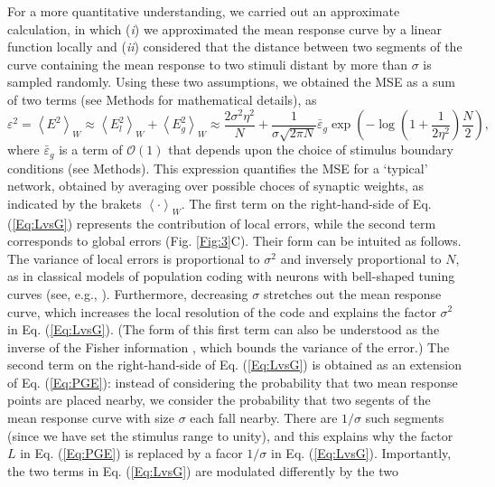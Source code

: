 \documentclass[a4paper]{article}%
\begin{document}
For a more quantitative understanding, we carried out an approximate
calculation, in which (\textit{i}) we approximated the mean response curve by
a linear function locally and (\textit{ii}) considered that the distance
between two segments of the curve containing the mean response to two stimuli
distant by more than $\sigma$ is sampled randomly. Using these two
assumptions, we obtained the MSE as a sum of two terms (see Methods for
mathematical details), as
\begin{equation}
\varepsilon^2 = \left\langle E^{2}\right\rangle _{W}\approx\left\langle
E_{l}^{2}\right\rangle _{W}+\left\langle E_{g}
^{2}\right\rangle _{W}\approx\frac{2\sigma^{2}\eta^{2}}{N}+\frac{1}
{\sigma\sqrt{2\pi N}}\bar{\varepsilon}_{g}\exp\left(  {-\log}\left(
{1+\frac{1}{2\eta^{2}}}\right)  \frac{N}{2}\right)  ,\label{Eq:LvsG}
\end{equation}
where $\bar{\varepsilon}_{g}$ is a term of $\mathcal{O}\left(  1\right)  $
that depends upon the choice of stimulus boundary conditions (see Methods).
This expression quantifies the MSE for a `typical' network, obtained by
averaging over possible choces of synaptic weights, as indicated by the
brakets $\left\langle \cdot\right\rangle _{W}$. The first term on the
right-hand-side of Eq. (\ref{Eq:LvsG}) represents the contribution of local
errors, while the second term corresponds to global errors (Fig.
\ref{Fig:3}C). Their form can be intuited as follows. The variance of local
errors is proportional to $\sigma^{2}$ and inversely proportional to $N$, as
in classical models of population coding with neurons with bell-shaped tuning
curves (see, e.g., \cite{Dayan2001TheoreticalSystems}). Furthermore, decreasing $\sigma$ stretches out the mean
response curve, which increases the local resolution of the code and explains
the factor $\sigma^{2}$ in Eq. (\ref{Eq:LvsG}). (The form of this first term
can also be understood as the inverse of the Fisher information
\cite[]{Seung1993SimpleCodes,Brunel1998MutualCoding}, which bounds the
variance of the error.) The second term on the right-hand-side of Eq.
(\ref{Eq:LvsG}) is obtained as an extension of Eq. (\ref{Eq:PGE}): instead of
considering the probability that two mean response points are placed nearby,
we consider the probability that two segents of the mean response curve with
size $\sigma$ each fall nearby. There are $1/\sigma$ such segments (since we
have set the stimulus range to unity), and this explains why the factor $L$ in
Eq. (\ref{Eq:PGE}) is replaced by a facor $1/\sigma$ in Eq. (\ref{Eq:LvsG}). Importantly, the
two terms in Eq. (\ref{Eq:LvsG}) are modulated differently by the two
\end{document}
